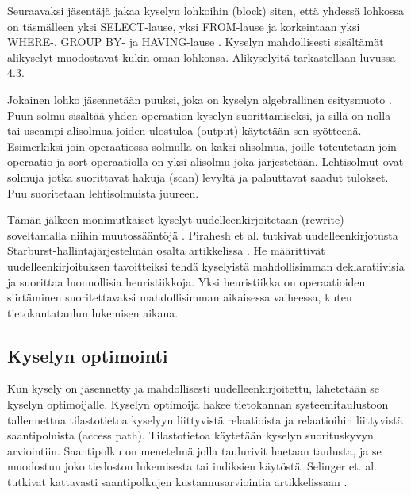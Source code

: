 \documentclass[finnish]{tktltiki2}
\theoremstyle{definition}
\theoremstyle{remark}
\begin{document}
Seuraavaksi jäsentäjä jakaa kyselyn lohkoihin (block) siten, että yhdessä lohkossa on täsmälleen yksi SELECT-lause, yksi FROM-lause ja korkeintaan yksi WHERE-, GROUP BY- ja HAVING-lause \cite{ramakrishnan2003database}. 
Kyselyn mahdollisesti sisältämät alikyselyt muodostavat kukin oman lohkonsa. Alikyselyitä tarkastellaan luvussa 4.3.

Jokainen lohko jäsennetään puuksi, joka on kyselyn algebrallinen esitysmuoto \cite{mahajan2012}. 
Puun solmu sisältää yhden operaation kyselyn suorittamiseksi, ja sillä on nolla tai useampi alisolmua joiden ulostuloa (output) käytetään sen syötteenä.
Esimerkiksi join-operaatiossa solmulla on kaksi alisolmua, joille toteutetaan join-operaatio ja sort-operaatiolla on yksi alisolmu joka järjestetään.
Lehtisolmut ovat solmuja jotka suorittavat hakuja (scan) levyltä ja palauttavat saadut tulokset. 
Puu suoritetaan lehtisolmuista juureen.

Tämän jälkeen monimutkaiset kyselyt uudelleenkirjoitetaan (rewrite) soveltamalla niihin muutossääntöjä \cite{ioannidis1996query}. Pirahesh et al. tutkivat uudelleenkirjotusta Starburst-hallintajärjestelmän osalta artikkelissa \cite{pirahesh1992extensible}. He määrittivät uudelleenkirjoituksen tavoitteiksi tehdä kyselyistä mahdollisimman deklaratiivisia ja suorittaa luonnollisia heuristiikkoja. Yksi heuristiikka on operaatioiden siirtäminen suoritettavaksi mahdollisimman aikaisessa vaiheessa, kuten tietokantataulun lukemisen aikana.


\subsection{Kyselyn optimointi}
Kun kysely on jäsennetty ja mahdollisesti uudelleenkirjoitettu, lähetetään se kyselyn optimoijalle. Kyselyn optimoija hakee tietokannan systeemitaulustoon tallennettua tilastotietoa kyselyyn liittyvistä relaatioista ja relaatioihin liittyvistä saantipoluista (access path). Tilastotietoa käytetään kyselyn suorituskyvyn arviointiin. Saantipolku on menetelmä jolla taulurivit haetaan taulusta, ja se muodostuu joko tiedoston lukemisesta tai indiksien käytöstä. Selinger et. al. tutkivat kattavasti saantipolkujen kustannusarviointia artikkelissaan \cite{selinger1979access}. 
\end{document}
